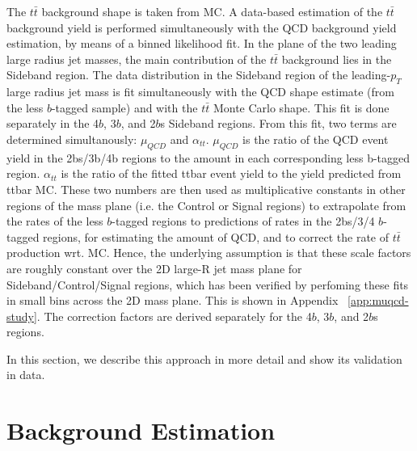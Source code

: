 The $t\bar{t}$ background shape is taken from MC. A data-based estimation of the $t\bar{t}$ background yield is performed simultaneously with the QCD background yield estimation, by means of a binned likelihood fit.
In the plane of the two leading large radius jet masses, the main contribution of the $t\bar{t}$ background lies in the Sideband region. The data distribution in the Sideband region of the leading-$p_{T}$ large radius jet mass is fit simultaneously with the QCD shape estimate (from the less $b$-tagged sample) and with the $t\bar{t}$ Monte Carlo shape. This fit is done separately in the 4$b$, 3$b$, and 2$b$s Sideband regions.
From this fit, two terms are determined simultanously: $\mu_{QCD}$ and $\alpha_{tt}$. $\mu_{QCD}$ is the ratio of the QCD event yield in the 2bs/3b/4b regions to the amount in each corresponding less b-tagged region. $\alpha_{tt}$ is the ratio of the fitted ttbar event yield to the yield predicted from ttbar MC.
These two numbers are then used as multiplicative constants in other regions of the mass plane (i.e. the Control or Signal regions) to extrapolate from the rates of the less $b$-tagged regions to predictions of rates in the 2bs/3/4 $b$-tagged regions, for estimating the amount of QCD, and to correct the rate of $t\bar{t}$ production wrt. MC. Hence, the underlying assumption is that these scale factors are roughly constant over the 2D large-R jet mass plane for Sideband/Control/Signal regions, which has been verified by perfoming these fits in small bins across the 2D mass plane. This is shown in Appendix ~\ref{app:muqcd-study}. The correction factors are derived separately for the 4$b$, 3$b$, and 2$b$s regions.

In this section, we describe this approach in more detail and show its validation in data.




\section{Background Estimation}
\label{sec:backgrounds}
